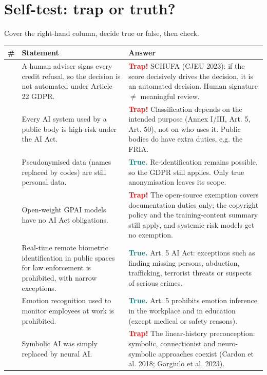 \documentclass[11pt,a4paper]{article}
\begin{document}
\section{Self-test: trap or truth?}
Cover the right-hand column, decide true or false, then check.
\begin{longtable}{>{\RaggedRight\arraybackslash}p{0.5cm}>{\RaggedRight\arraybackslash}p{7.6cm}>{\RaggedRight\arraybackslash}p{7.4cm}}\toprule \# & Statement & Answer\\\midrule\endhead\bottomrule\endfoot
1 & A human adviser signs every credit refusal, so the decision is not automated under Article 22 GDPR. & \textcolor{red}{\textbf{Trap!}} SCHUFA (CJEU 2023): if the score decisively drives the decision, it is an automated decision. Human signature $\neq$ meaningful review.\\[3pt]
2 & Every AI system used by a public body is high-risk under the AI Act. & \textcolor{red}{\textbf{Trap!}} Classification depends on the intended purpose (Annex I/III, Art. 5, Art. 50), not on who uses it. Public bodies do have extra duties, e.g. the FRIA.\\[3pt]
3 & Pseudonymised data (names replaced by codes) are still personal data. & \textcolor{teal}{\textbf{True.}} Re-identification remains possible, so the GDPR still applies. Only true anonymisation leaves its scope.\\[3pt]
4 & Open-weight GPAI models have no AI Act obligations. & \textcolor{red}{\textbf{Trap!}} The open-source exemption covers documentation duties only; the copyright policy and the training-content summary still apply, and systemic-risk models get no exemption.\\[3pt]
5 & Real-time remote biometric identification in public spaces for law enforcement is prohibited, with narrow exceptions. & \textcolor{teal}{\textbf{True.}} Art. 5 AI Act: exceptions such as finding missing persons, abduction, trafficking, terrorist threats or suspects of serious crimes.\\[3pt]
6 & Emotion recognition used to monitor employees at work is prohibited. & \textcolor{teal}{\textbf{True.}} Art. 5 prohibits emotion inference in the workplace and in education (except medical or safety reasons).\\[3pt]
7 & Symbolic AI was simply replaced by neural AI. & \textcolor{red}{\textbf{Trap!}} The linear-history preconception: symbolic, connectionist and neuro-symbolic approaches coexist (Cardon et al. 2018; Gargiulo et al. 2023).\\[3pt]

\end{longtable}
\end{document}
